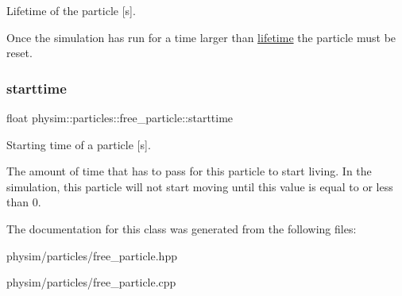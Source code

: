 Lifetime of the particle \mbox{[}s\mbox{]}. 

Once the simulation has run for a time larger than \hyperlink{classphysim_1_1particles_1_1free__particle_a5870d6fd3167d2c6120f887f45fe50fc}{lifetime} the particle must be reset. \mbox{\label{classphysim_1_1particles_1_1free__particle_ad0379ba926ecc909bfbfb373045bfcf9}} 
\subsubsection{\texorpdfstring{starttime}{starttime}}
{\footnotesize\ttfamily float physim\+::particles\+::free\+\_\+particle\+::starttime}



Starting time of a particle \mbox{[}s\mbox{]}. 

The amount of time that has to pass for this particle to start \textquotesingle{}living\textquotesingle{}. In the simulation, this particle will not start moving until this value is equal to or less than 0. 

The documentation for this class was generated from the following files\+:\begin{DoxyCompactItemize}
\item 
physim/particles/free\+\_\+particle.\+hpp\item 
physim/particles/free\+\_\+particle.\+cpp\end{DoxyCompactItemize}
